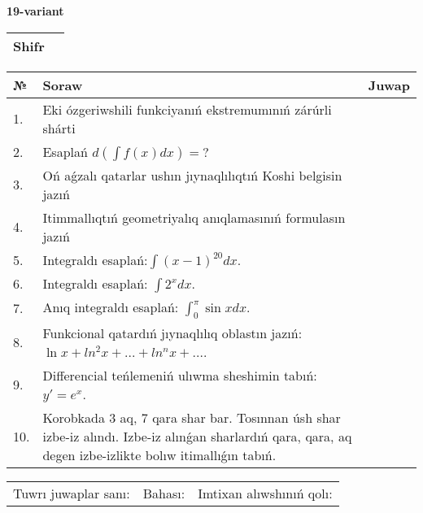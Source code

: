 \documentclass{article}
\begin{document}
  \egroup
  
  \newpage
  
  
  \textbf{19-variant}\\
  
  \bgroup
  \def\arraystretch{1.6} %
  
  \begin{tabular}{|m{5.7cm}|m{9.5cm}|}
  \hline
  Shifr & \\
  \hline
  \end{tabular}
  
  \vspace{1cm}
  
  \begin{tabular}{|m{0.7cm}|m{10cm}|m{4cm}|}
  \hline
  № & Soraw & Juwap \\
  \hline
  1. & Eki ózgeriwshili funkciyanıń ekstremumınıń zárúrli shárti &  \\
  \hline
  2. & Esaplań \(d\left( \int{f(x)dx} \right) = ?\) &  \\
  \hline
  3. & Oń aǵzalı qatarlar ushın jıynaqlılıqtıń Koshi belgisin jazıń &  \\
  \hline
  4. & Itimmallıqtıń geometriyalıq anıqlamasınıń formulasın jazıń &  \\
  \hline
  5. & Integraldı esaplań:\(\int{(x - 1)^{20}}dx\). &  \\
  \hline
  6. & Integraldı esaplań: \(\int{2^{x}dx}\). &  \\
  \hline
  7. & Anıq integraldı esaplań: \(\int_{0}^{\pi}{\sin xdx}\). &  \\
  \hline
  8. & Funkcional qatardıń jıynaqlılıq oblastın jazıń: \(\ln x + ln^2 x + ... + ln^{n}x + ...\). &  \\
  \hline
  9. & Differencial teńlemeniń ulıwma sheshimin tabıń: \(y' = e^{x}\). &  \\
  \hline
  10. & Korobkada 3 aq, 7 qara shar bar. Tosınnan úsh shar izbe-iz alındı. Izbe-iz alınǵan sharlardıń qara, qara, aq degen izbe-izlikte bolıw itimallıǵın tabıń. &  \\
  \hline
  \end{tabular}
  
  \vspace{1cm}
  
  \begin{tabular}{lll}
  Tuwrı juwaplar sanı: \underline{\hspace{1.5cm}} & 
  Bahası: \underline{\hspace{1.5cm}} & 
  Imtixan alıwshınıń qolı: \underline{\hspace{2cm}} \\
  \end{tabular}
  
\end{document}
